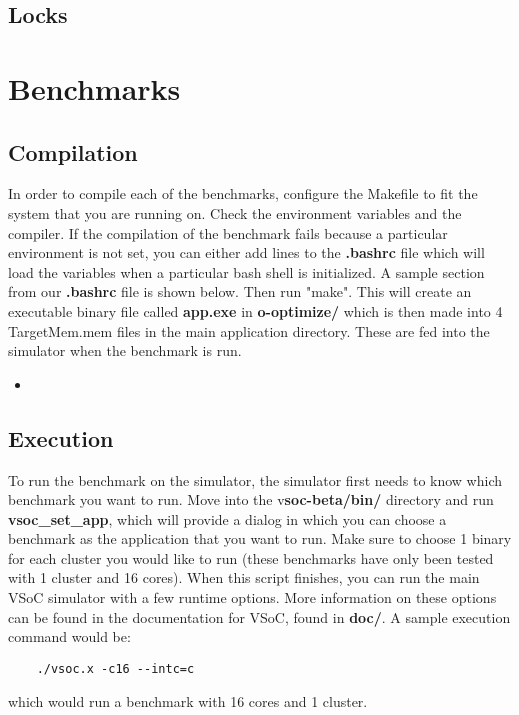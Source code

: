 \documentclass{article}
\newcommand{\bashscript}[2]{
\begin{itemize}
\item[]
\end{itemize}
}
\begin{document}
\subsection{Locks}

\newpage
\section{Benchmarks}
\subsection{Compilation}

In order to compile each of the benchmarks, configure the Makefile to fit the system that you 
are running on. Check the environment variables and the compiler. If the compilation of the 
benchmark fails because a particular environment is not set, you can either add lines to the 
\textbf{.bashrc} file which will load the variables when a particular bash shell is initialized.  A sample section 
from our \textbf{.bashrc} file is shown below. Then run 
"make". This will create an executable binary file called \textbf{app.exe} in \textbf{o-optimize/} which is then 
made into 4 TargetMem\*.mem files in the main application directory. These are 
fed into the simulator when the benchmark is run. 

\bashscript{bash}{Sample .bashrc file for environment variables}

\subsection{Execution}

To run the benchmark on the simulator, the simulator first needs to know which 
benchmark you want to run. Move into the v\textbf{soc-beta/bin/} directory and run 
\textbf{vsoc\_set\_app}, which will provide a dialog in which you can choose a 
benchmark as the application that you want to run.  Make sure to choose 1 
binary for each cluster you would like to run (these benchmarks have only been 
tested with 1 cluster and 16 cores). When this script finishes, you can run the 
main VSoC simulator with a few runtime options. More information on these 
options can be found in the documentation for VSoC, found in \textbf{doc/}.  
A sample execution command would be:
\begin{center}
\begin{verbatim} 
	./vsoc.x -c16 --intc=c 
\end{verbatim} 
\end{center}
which would run a benchmark with 16 cores and 1 cluster. 
\end{document}
